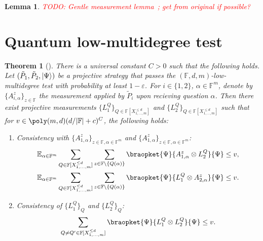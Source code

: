 \documentclass[english,12pt]{reedthesis}
\theoremstyle{plain}
\newtheorem{thm}{Theorem}[section]
\newtheorem{lemma}[lemma]{Lemma}
\theoremstyle{definition}
\theoremstyle{remark}
\DeclarePairedDelimiter{\abs}{\lvert}{\rvert}
\DeclarePairedDelimiter\ket{\lvert}{\rangle}
\newcommand{\TODO}[1]{\textcolor{red}{TODO: #1}}
\begin{document}
\begin{lemma}\label{lem:gentle-measurement}
  \TODO{Gentle measurement lemma~\cite[Lemma 7.1]{CFGS22}; get from original if
    possible?}
\end{lemma}

\section{Quantum low-multidegree test}\label{sec:quantum-multidegree-test}

\begin{thm}[{\cite{JNVWY20}}]\label{thm:quantum-low-degree}
  There is a universal constant $C > 0$ such that the following holds. Let
  $(\tilde{P}_{1}, \tilde{P}_{2}, \ket{\Psi})$ be a projective strategy that passes
  the $(\mathbb{F}, d, m)$-low-multidegree test with probability at least
  $1 - \varepsilon$. For $i \in \{1, 2\}$, $\alpha \in \mathbb{F}^{m}$, denote by
  $\{A_{i,\alpha}^{z}\}_{z \in \mathbb{F}}$ the measurement applied by $\tilde{P}_{i}$
  upon recieving question $\alpha$. Then there exist projective measurements
  $\{L_{1}^{Q}\}_{Q \in \mathbb{F}[X_{1, \ldots, m}^{\le d}]}$ and
  $\{L_{2}^{Q}\}_{Q \in \mathbb{F}[X_{1, \ldots, m}^{\le d}]}$ such that for
  $v \in \poly(m, d)(d/\abs{\mathbb{F}} + c)^{C}$, the following holds:
  \begin{enumerate}
    \item Consistency with
          $\{A_{1, \alpha}^{z}\}_{z \in \mathbb{F}, \alpha \in \mathbb{F}^{m}}$ and
          $\{A_{1, \alpha}^{z}\}_{z \in \mathbb{F}, \alpha \in \mathbb{F}^{m}}$:
          \begin{align}
            \mathbb{E}_{\alpha \in \mathbb{F}^{m}}\sum_{Q \in \mathbb{F}[X_{1, \ldots, m}^{\le d}]}\sum_{z \in \mathbb{F} \setminus \{Q(\alpha)\}}
            \braopket{\Psi}{A_{1,\alpha}^{z} \otimes L_{2}^{Q}}{\Psi} &\le v, \\
            \mathbb{E}_{\alpha \in \mathbb{F}^{m}}\sum_{Q \in \mathbb{F}[X_{1, \ldots, m}^{\le d}]}\sum_{z \in \mathbb{F} \setminus \{Q(\alpha)\}}
            \braopket{\Psi}{L_{1}^{Q} \otimes A_{2,\alpha}^{z}}{\Psi} &\le v.
          \end{align}
    \item Consistency of $\{L_{1}^{Q}\}_{Q}$ and $\{L_{2}^{Q}\}_{Q}$:
          \begin{equation}
            \sum_{Q \ne Q' \in \mathbb{F}[X_{1, \ldots, m}^{\le d}]}\braopket{\Psi}{L_{1}^{Q} \otimes L_{2}^{Q}}{\Psi} \le v.
          \end{equation}
  \end{enumerate}
\end{thm}
\end{document}
